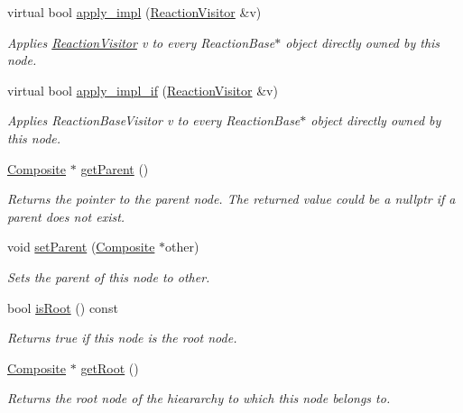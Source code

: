 \begin{DoxyCompactItemize}
virtual bool \hyperlink{classchem_1_1Component_a6db30c430a0eec9b0891cf3fc635ae1a}{apply\-\_\-impl} (\hyperlink{classchem_1_1ReactionVisitor}{Reaction\-Visitor} \&v)
\begin{DoxyCompactList}\small\item\em Applies \hyperlink{classchem_1_1ReactionVisitor}{Reaction\-Visitor} v to every Reaction\-Base$\ast$ object directly owned by this node. \end{DoxyCompactList}\item 
virtual bool \hyperlink{classchem_1_1Component_a9d22fee87e12e9dbe66ad7fe7e6df130}{apply\-\_\-impl\-\_\-if} (\hyperlink{classchem_1_1ReactionVisitor}{Reaction\-Visitor} \&v)
\begin{DoxyCompactList}\small\item\em Applies Reaction\-Base\-Visitor v to every Reaction\-Base$\ast$ object directly owned by this node. \end{DoxyCompactList}\item 
\hyperlink{classchem_1_1Composite}{Composite} $\ast$ \hyperlink{classchem_1_1Component_a32812270ee52f07ceae2194c56864fd6}{get\-Parent} ()
\begin{DoxyCompactList}\small\item\em Returns the pointer to the parent node. The returned value could be a nullptr if a parent does not exist. \end{DoxyCompactList}\item 
void \hyperlink{classchem_1_1Component_a1f4e4d1566f1d3026f1e2a14fa3dffd9}{set\-Parent} (\hyperlink{classchem_1_1Composite}{Composite} $\ast$other)
\begin{DoxyCompactList}\small\item\em Sets the parent of this node to other. \end{DoxyCompactList}\item 
bool \hyperlink{classchem_1_1Component_a75cd13a0d884f82fcddd574de33fbfe6}{is\-Root} () const 
\begin{DoxyCompactList}\small\item\em Returns true if this node is the root node. \end{DoxyCompactList}\item 
\hyperlink{classchem_1_1Composite}{Composite} $\ast$ \hyperlink{classchem_1_1Component_a7f1166f8fb4c9526cd1794ec3c2714f5}{get\-Root} ()
\begin{DoxyCompactList}\small\item\em Returns the root node of the hieararchy to which this node belongs to. \end{DoxyCompactList}\item 

\end{DoxyCompactItemize}
